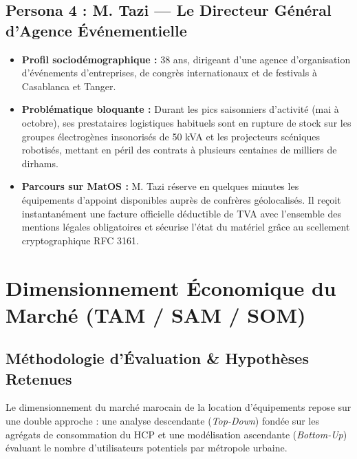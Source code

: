 \documentclass[11pt,a4paper]{report}
\begin{document}
\section{Persona 4 : M. Tazi --- Le Directeur Général d'Agence Événementielle}
\begin{itemize}[leftmargin=*]
    \item \textbf{Profil sociodémographique :} 38 ans, dirigeant d'une agence d'organisation d'événements d'entreprises, de congrès internationaux et de festivals à Casablanca et Tanger.
    \item \textbf{Problématique bloquante :} Durant les pics saisonniers d'activité (mai à octobre), ses prestataires logistiques habituels sont en rupture de stock sur les groupes électrogènes insonorisés de 50 kVA et les projecteurs scéniques robotisés, mettant en péril des contrats à plusieurs centaines de milliers de dirhams.
    \item \textbf{Parcours sur MatOS :} M. Tazi réserve en quelques minutes les équipements d'appoint disponibles auprès de confrères géolocalisés. Il reçoit instantanément une facture officielle déductible de TVA avec l'ensemble des mentions légales obligatoires et sécurise l'état du matériel grâce au scellement cryptographique RFC 3161.
\end{itemize}

\chapter{Dimensionnement Économique du Marché (TAM / SAM / SOM)}

\section{Méthodologie d'Évaluation \& Hypothèses Retenues}
Le dimensionnement du marché marocain de la location d'équipements repose sur une double approche : une analyse descendante (\textit{Top-Down}) fondée sur les agrégats de consommation du HCP et une modélisation ascendante (\textit{Bottom-Up}) évaluant le nombre d'utilisateurs potentiels par métropole urbaine.
\end{document}
